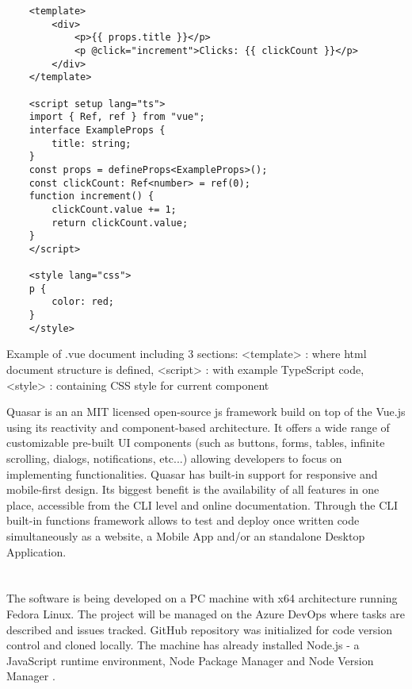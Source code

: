 \begin{listing}[H]
    \begin{verbatim}
    <template>
        <div>
            <p>{{ props.title }}</p>
            <p @click="increment">Clicks: {{ clickCount }}</p>
        </div>
    </template>
    
    <script setup lang="ts">
    import { Ref, ref } from "vue";
    interface ExampleProps {
        title: string;
    }
    const props = defineProps<ExampleProps>();
    const clickCount: Ref<number> = ref(0);
    function increment() {
        clickCount.value += 1;
        return clickCount.value;
    }
    </script>
    
    <style lang="css">
    p {
        color: red;
    }
    </style>
    \end{verbatim}
\caption[Vue document example]{Example of .vue document including 3 sections: \newline <template> : where html document structure is defined, \newline<script> : with example TypeScript code, \newline<style> : containing CSS style for current component}
\end{listing}

Quasar is an an MIT licensed open-source js framework build on top of the Vue.js using its reactivity and component-based architecture. It offers a wide range of customizable pre-built UI components (such as buttons, forms, tables, infinite scrolling, dialogs, notifications, etc...) allowing developers to focus on implementing functionalities. Quasar has built-in support for responsive and mobile-first design. Its biggest benefit is the availability of all features in one place, accessible from the CLI level and online documentation.
Through the CLI built-in functions framework allows to test and deploy once written code simultaneously as a website, a Mobile App and/or an standalone Desktop Application. \autocite{QuasarStart}

\section{}%
\label{sec:prerequisites}

The software is being developed on a PC machine with x64 architecture running Fedora Linux. The project  will be managed on the Azure DevOps where tasks are described and issues tracked. GitHub repository was initialized for code version control and cloned locally. The machine has already installed Node.js - a JavaScript runtime environment, Node Package Manager \autocite{npm} and Node Version Manager \autocite{nvm}. 


